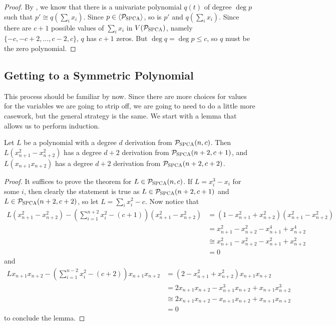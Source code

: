\begin{proof}
By , we know that there is a univariate polynomial $q(t)$ of degree $\deg p$ such that $p' \cong q(\sum_i x_i)$. Since $p \in \langle \mathcal P_{\textsc{SPCA}} \rangle$, so is $p'$ and $q(\sum_i x_i)$. Since there are $c+1$ possible values of $\sum_i x_i$ in $V(\mathcal P_{\textsc{SPCA}})$, namely $\{-c, -c+2, \dots, c-2, c\}$, $q$ has $c+1$ zeros. But $\deg q = \deg p \leq c$, so $q$ must be the zero polynomial.
\end{proof}

\subsection{Getting to a Symmetric Polynomial}
This process should be familiar by now. Since there are more choices for values for the variables we are going to strip off, we are going to need to do a little more casework, but the general strategy is the same. We start with a lemma that allows us to perform induction.
\begin{lemma}\label{lem:bcpa-induct}
Let $L$ be a polynomial with a degree $d$ derivation from $\mathcal P_{\textsc{SPCA}}(n,c)$. Then $L(x_{n+1}^2-x_{n+2}^2)$ has a degree $d+2$ derivation from $\mathcal P_{\textsc{SPCA}}(n+2,c+1)$, and $L(x_{n+1}x_{n+2})$ has a degree $d+2$ derivation from $\mathcal P_{\textsc{SPCA}}(n+2,c+2)$.
\end{lemma}
\begin{proof}
It suffices to prove the theorem for $L \in \mathcal P_{\textsc{SPCA}}(n,c)$. If $L = x_i^3 - x_i$ for some $i$, then clearly the statement is true as $L \in \mathcal P_{\textsc{SPCA}}(n+2,c+1)$ and $L \in \mathcal P_{\textsc{SPCA}}(n+2,c+2)$, so let $L = \sum_i x_i^2 - c$. Now notice that 
\begin{align*}
L(x_{n+1}^2 - x_{n+2}^2) - \left(\sum_{i=1}^{n+2} x_i^2 - (c+1)\right)(x_{n+1}^2-x_{n+2}^2) &= (1-x_{n+1}^2+x_{n+2}^2)(x_{n+1}^2-x_{n+2}^2) \\
&= x_{n+1}^2 - x_{n+2}^2 - x_{n+1}^4 + x_{n+2}^4  \\
&\cong x_{n+1}^2 - x_{n+2}^2 - x_{n+1}^2 + x_{n+2}^2 \\
&= 0
\end{align*}
and 
\begin{align*}
Lx_{n+1}x_{n+2} - \left(\sum_{i=1}^{n-2} x_i^2 - (c+2)\right)x_{n+1}x_{n+2} &= (2-x_{n+1}^2 + x_{n+2}^2)x_{n+1}x_{n+2} \\
&= 2x_{n+1}x_{n+2} - x_{n+1}^3x_{n+2} + x_{n+1}x_{n+2}^3 \\
&\cong 2x_{n+1}x_{n+2} - x_{n+1}x_{n+2} + x_{n+1}x_{n+2} \\
&= 0
\end{align*}
to conclude the lemma. 
\end{proof}
